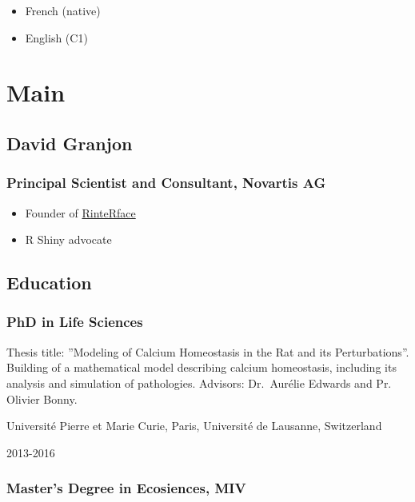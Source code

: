 \documentclass[
]{article}
\providecommand{\tightlist}{%
  \setlength{\itemsep}{0pt}\setlength{\parskip}{0pt}}
\begin{document}
\begin{itemize}
\tightlist
\item
  French (native)
\item
  English (C1)
\end{itemize}

\hypertarget{main}{%
\section{Main}\label{main}}

\hypertarget{title}{%
\subsection{David Granjon}\label{title}}

\hypertarget{principal-scientist-and-consultant-novartis-ag}{%
\subsubsection{Principal Scientist and Consultant, Novartis
AG}\label{principal-scientist-and-consultant-novartis-ag}}

\begin{itemize}
\tightlist
\item
  Founder of \href{https://rinterface.com}{RinteRface}
\item
  R Shiny advocate
\end{itemize}

\hypertarget{education}{%
\subsection{Education}\label{education}}

\hypertarget{phd-in-life-sciences}{%
\subsubsection{PhD in Life Sciences}\label{phd-in-life-sciences}}

Thesis title: ''Modeling of Calcium Homeostasis in the Rat and its
Perturbations''. Building of a mathematical model describing calcium
homeostasis, including its analysis and simulation of pathologies.
Advisors: Dr.~Aurélie Edwards and Pr. Olivier Bonny.

Université Pierre et Marie Curie, Paris, Université de Lausanne,
Switzerland

2013-2016

\hypertarget{masters-degree-in-ecosiences-miv}{%
\subsubsection{Master's Degree in Ecosiences,
MIV}\label{masters-degree-in-ecosiences-miv}}
\end{document}
